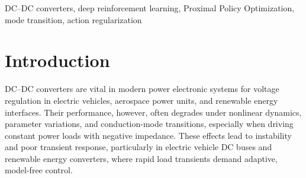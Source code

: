 \documentclass[conference]{IEEEtran}
\begin{document}
\begin{abstract}
DC--DC converters are fundamental in modern power electronic systems, yet their performance often deteriorates under nonlinear dynamics, parameter variations, and conduction-mode transitions, particularly when supplying constant power loads with negative impedance. Conventional controllers rely on precise models and exhibit limited robustness, while existing deep reinforcement learning (DRL) methods often suffer from oscillations and poor generalization. This paper presents a model-free control framework based on the Proximal Policy Optimization (PPO) algorithm, which expands the observation space, shapes the reward for voltage accuracy and smooth action behavior, and unifies operation across conduction modes without explicit mode detection. Trained and validated in a high-fidelity MATLAB/Simulink environment, the proposed controller achieves overshoot below \textbf{5\%}, a \textbf{10\,\textmu s} settling time, and about \textbf{4\,mV} output ripple while maintaining stability under \textbf{±30\%} parameter variations. A feasibility analysis on a \textbf{500\,MHz} Zynq-7030 FPGA shows that the trained PPO agent (two 128-neuron layers) executes approximately \textbf{1.8×10\textsuperscript{4}} MACs per inference with an estimated latency of \textbf{0.14\,\textmu s}, indicating that direct \textbf{2\,MHz} real-time control is theoretically achievable.


\end{abstract}

\begin{IEEEkeywords}
DC–DC converters, deep reinforcement learning, Proximal Policy Optimization, mode transition, action regularization
\end{IEEEkeywords}

\section{Introduction}

DC--DC converters are vital in modern power electronic systems for voltage regulation in electric vehicles, aerospace power units, and renewable energy interfaces. Their performance, however, often degrades under nonlinear dynamics, parameter variations, and conduction-mode transitions, especially when driving constant power loads with negative impedance. These effects lead to instability and poor transient response, particularly in electric vehicle DC buses and renewable energy converters, where rapid load transients demand adaptive, model-free control.
\end{document}

